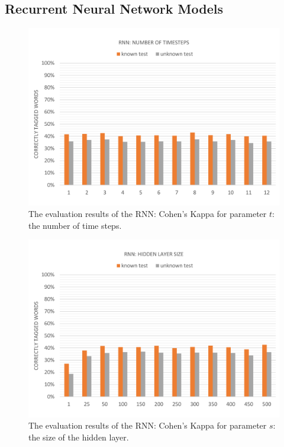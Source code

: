 \subsection{Recurrent Neural Network Models}\label{c.evaluation.results.rnn}
\begin{figure}[H]
	\hspace{-5mm}\includegraphics[width=1.07\textwidth]{images/evaluation_rnn_t}
	\caption[RNN Evaluation: Number of Time Steps]{The evaluation results of the RNN: Cohen's Kappa for parameter $t$: the number of time steps.}
	\label{f.evaluation.rnn.t}
\end{figure}

\begin{figure}[H]
	\hspace{-5mm}\includegraphics[width=1.07\textwidth]{images/evaluation_rnn_s}
	\caption[RNN Evaluation: Hidden Layer Size]{The evaluation results of the RNN: Cohen's Kappa for parameter $s$: the size of the hidden layer.}
	\label{f.evaluation.rnn.s}
\end{figure}

